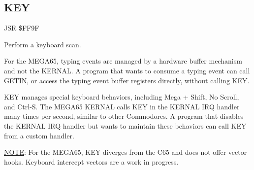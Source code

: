 
\newpage
\subsection{KEY}
\label{KERNAL Jump Table!KEY}
\begin{description}[leftmargin=2cm,style=nextline]
    \item [Address:] JSR \$FF9F
    \item [Description:] Perform a keyboard scan.
    \item [Remarks:]
        For the MEGA65, typing events are managed by a hardware buffer mechanism and not the KERNAL. A program that wants to consume a typing event can call GETIN, or access the typing event buffer registers directly, without calling KEY.

        KEY manages special keyboard behaviors, including Mega + Shift, No Scroll, and Ctrl-S. The MEGA65 KERNAL calls KEY in the KERNAL IRQ handler many times per second, similar to other Commodores. A program that disables the KERNAL IRQ handler but wants to maintain these behaviors can call KEY from a custom handler.

        \underline{NOTE}: For the MEGA65, KEY diverges from the C65 and does not offer vector hooks. Keyboard intercept vectors are a work in progress.
    \item [Example:]
\end{description}



\newpage
